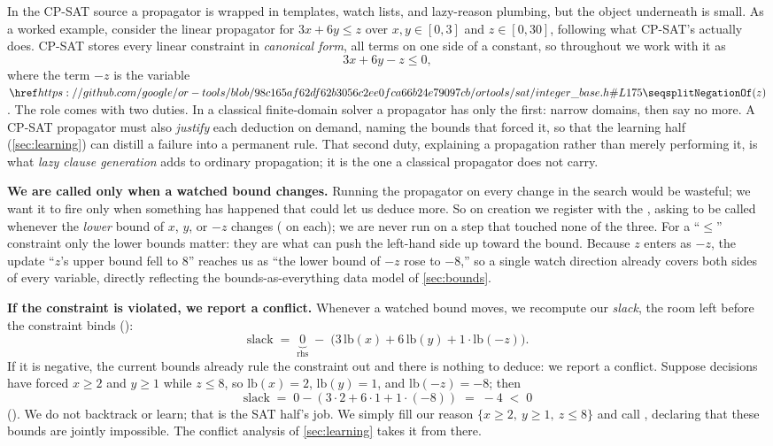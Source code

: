 In the CP-SAT source a propagator is wrapped in templates, watch lists, and
lazy-reason plumbing, but the object underneath is small. As a worked example, consider the linear propagator for $3x + 6y \le z$ over
$x, y \in [0,3]$ and $z \in [0,30]$, following what CP-SAT's
 actually does. CP-SAT stores
every linear constraint in \emph{canonical form}, all terms on one side of a
constant, so throughout we work with it as
\[
  3x + 6y - z \le 0 ,
\]
where the term $-z$ is the variable $\srcla{integer\_base.h}{175}{NegationOf}(z)$.
The role comes with two duties. In a classical finite-domain
solver a propagator has only the first: narrow domains, then say no more. A
CP-SAT propagator must also \emph{justify} each deduction on demand, naming the
bounds that forced it, so that the learning half (\cref{sec:learning}) can
distill a failure into a permanent rule. That second duty, explaining a
propagation rather than merely performing it, is what \emph{lazy clause
generation} adds to ordinary propagation; it is the one a classical propagator
does not carry.

\textbf{We are called only when a watched bound changes.} Running the propagator on
every change in the search would be wasteful; we want it to fire only when something
has happened that could let us deduce more. So on creation we register with the
, asking to be called whenever the
\emph{lower} bound of $x$, $y$, or $-z$ changes ( on each); we are never run on a step that touched none of the
three. For a ``$\le$'' constraint only the lower bounds matter: they are what can
push the left-hand side up toward the bound. Because $z$ enters as $-z$, the update
``$z$'s upper bound fell to $8$'' reaches us as ``the lower bound of $-z$ rose to
$-8$,'' so a single watch direction already covers both sides of every variable,
directly reflecting the bounds-as-everything data model of \cref{sec:bounds}.

\textbf{If the constraint is violated, we report a conflict.} Whenever a watched
bound moves, we recompute our \emph{slack}, the room left before the constraint
binds ():
\[
  \text{slack} \;=\; \underbrace{0}_{\text{rhs}}
  \;-\; \big(3\,\text{lb}(x) + 6\,\text{lb}(y) + 1\cdot\text{lb}(-z)\big) .
\]
If it is negative, the current bounds already rule the constraint out and there is
nothing to deduce: we report a conflict. Suppose decisions have forced $x \ge 2$
and $y \ge 1$ while $z \le 8$, so $\text{lb}(x) = 2$, $\text{lb}(y) = 1$, and
$\text{lb}(-z) = -8$; then
\[
  \text{slack} \;=\; 0 - (3\cdot 2 + 6\cdot 1 + 1\cdot(-8)) \;=\; -4 \;<\; 0
\]
(). We do not backtrack or learn; that is the SAT
half's job. We simply fill our reason $\{x \ge 2,\ y \ge 1,\ z \le 8\}$ and call
, declaring that these bounds
are jointly impossible. The conflict analysis of \cref{sec:learning}
takes it from there.

